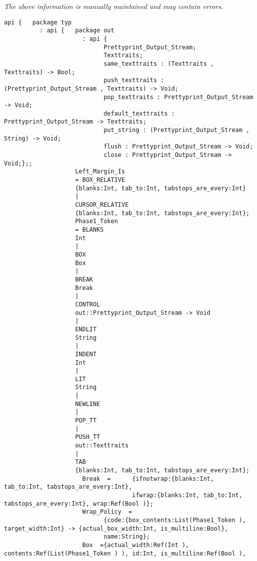 \label{api:Base\_Prettyprinter}

{\tiny \it The above information is manually maintained and may contain errors.}
\begin{verbatim}
api {   package typ
          : api {   package out
                      : api {
                            Prettyprint_Output_Stream;
                            Texttraits;
                            same_texttraits : (Texttraits , Texttraits) -> Bool;
                            push_texttraits : (Prettyprint_Output_Stream , Texttraits) -> Void;
                            pop_texttraits : Prettyprint_Output_Stream -> Void;
                            default_texttraits : Prettyprint_Output_Stream -> Texttraits;
                            put_string : (Prettyprint_Output_Stream , String) -> Void;
                            flush : Prettyprint_Output_Stream -> Void;
                            close : Prettyprint_Output_Stream -> Void;};;
                    Left_Margin_Is
                    = BOX_RELATIVE
                    {blanks:Int, tab_to:Int, tabstops_are_every:Int}
                    |
                    CURSOR_RELATIVE
                    {blanks:Int, tab_to:Int, tabstops_are_every:Int};
                    Phase1_Token
                    = BLANKS
                    Int
                    |
                    BOX
                    Box
                    |
                    BREAK
                    Break
                    |
                    CONTROL
                    out::Prettyprint_Output_Stream -> Void
                    |
                    ENDLIT
                    String
                    |
                    INDENT
                    Int
                    |
                    LIT
                    String
                    |
                    NEWLINE
                    |
                    POP_TT
                    |
                    PUSH_TT
                    out::Texttraits
                    |
                    TAB
                    {blanks:Int, tab_to:Int, tabstops_are_every:Int};
                      Break  =      {ifnotwrap:{blanks:Int, tab_to:Int, tabstops_are_every:Int},
                                    ifwrap:{blanks:Int, tab_to:Int, tabstops_are_every:Int}, wrap:Ref(Bool )};
                      Wrap_Policy  =
                            {code:{box_contents:List(Phase1_Token ), target_width:Int} -> {actual_box_width:Int, is_multiline:Bool},
                            name:String};
                      Box  ={actual_width:Ref(Int ), contents:Ref(List(Phase1_Token ) ), id:Int, is_multiline:Ref(Bool ),

\end{verbatim}

